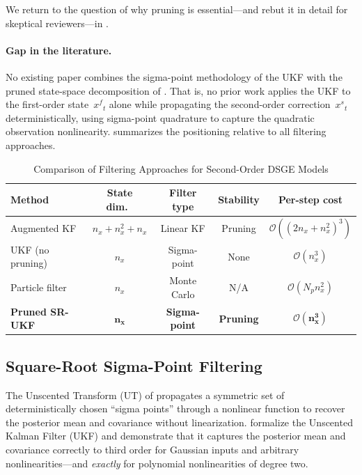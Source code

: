 \documentclass[12pt,a4paper]{article}
\newcommand{\xf}{{x^{f}}}
\newcommand{\xs}{{x^{s}}}
\newcommand{\cO}{\mathcal{O}}
\begin{document}
We return to the question of why pruning is essential---and
rebut it in detail for skeptical reviewers---in
.

\paragraph{Gap in the literature.}
No existing paper combines the sigma-point methodology of the UKF
with the pruned state-space decomposition of
\citet{andreasen2018pruned}. That is, no prior work applies the
UKF to the first-order state~$\xf_t$ alone while propagating the
second-order correction~$\xs_t$ deterministically, using sigma-point
quadrature to capture the quadratic observation nonlinearity.
 summarizes the positioning relative to
all filtering approaches.

\begin{table}[htbp]
\centering
\caption{Comparison of Filtering Approaches for Second-Order DSGE Models}
\label{tab:comparison}
\begin{tabular}{@{}lcccc@{}}
\toprule
Method & State dim.\ & Filter type & Stability & Per-step cost \\
\midrule
Augmented KF
  & $n_x{+}n_x^2{+}n_x$
  & Linear KF
  & Pruning
  & $\cO\!\left((2n_x{+}n_x^2)^3\right)$ \\
UKF (no pruning)
  & $n_x$
  & Sigma-point
  & None
  & $\cO(n_x^3)$ \\
Particle filter
  & $n_x$
  & Monte Carlo
  & N/A
  & $\cO(N_p n_x^2)$ \\
\textbf{Pruned SR-UKF}
  & $\bm{n_x}$
  & \textbf{Sigma-point}
  & \textbf{Pruning}
  & $\bm{\cO(n_x^3)}$ \\
\bottomrule
\end{tabular}
\end{table}

\subsection{Square-Root Sigma-Point Filtering}

The Unscented Transform (UT) of \citet{julier1997new} propagates a
symmetric set of deterministically chosen ``sigma points'' through a
nonlinear function to recover the posterior mean and covariance without
linearization. \citet{wan2000unscented} formalize the Unscented Kalman
Filter (UKF) and demonstrate that it captures the posterior mean and
covariance correctly to third order for Gaussian inputs and arbitrary
nonlinearities---and \emph{exactly} for polynomial nonlinearities of
degree two.
\end{document}

